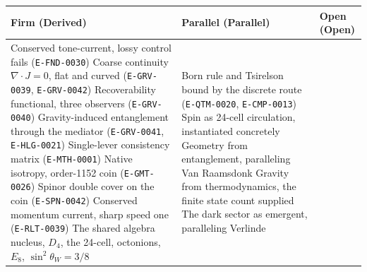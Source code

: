 \begin{table}[h]
\centering
\begin{tabularx}{\textwidth}{@{}>{\raggedright\arraybackslash}X >{\raggedright\arraybackslash}X >{\raggedright\arraybackslash}X@{}}
\toprule
\textbf{Firm (Derived)} & \textbf{Parallel (Parallel)} & \textbf{Open (Open)} \\
\midrule
Conserved tone-current, lossy control fails (\texttt{E-FND-0030})
\newline\newline
Coarse continuity $\nabla\!\cdot J = 0$, flat and curved (\texttt{E-GRV-0039}, \texttt{E-GRV-0042})
\newline\newline
Recoverability functional, three observers (\texttt{E-GRV-0040})
\newline\newline
Gravity-induced entanglement through the mediator (\texttt{E-GRV-0041}, \texttt{E-HLG-0021})
\newline\newline
Single-lever consistency matrix (\texttt{E-MTH-0001})
\newline\newline
Native isotropy, order-1152 coin (\texttt{E-GMT-0026})
\newline\newline
Spinor double cover on the coin (\texttt{E-SPN-0042})
\newline\newline
Conserved momentum current, sharp speed one (\texttt{E-RLT-0039})
\newline\newline
The shared algebra nucleus, $D_4$, the 24-cell, octonions, $E_8$, $\sin^2\theta_W = 3/8$
&
Born rule and Tsirelson bound by the discrete route (\texttt{E-QTM-0020}, \texttt{E-CMP-0013})
\newline\newline
Spin as 24-cell circulation, instantiated concretely
\newline\newline
Geometry from entanglement, paralleling Van Raamsdonk \cite{vanraamsdonk2010}
\newline\newline
Gravity from thermodynamics, the finite state count supplied \cite{jacobson1995, padmanabhan2010}
\newline\newline
The dark sector as emergent, paralleling Verlinde \cite{verlinde2011}
\newline\newline

\end{tabularx}
\end{table}
